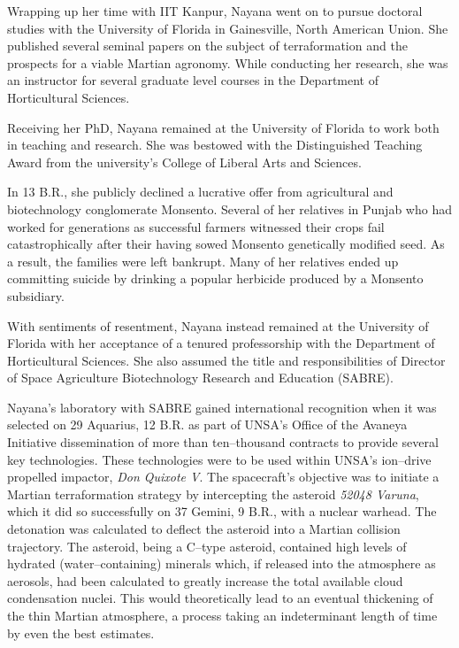 Wrapping up her time with IIT Kanpur, Nayana went on to pursue doctoral studies with the University of Florida in Gainesville, North American Union. She published several seminal papers on the subject of terraformation and the prospects for a viable Martian agronomy. While conducting her research, she was an instructor for several graduate level courses in the Department of Horticultural Sciences.

Receiving her PhD, Nayana remained at the University of Florida to work both in teaching and research. She was bestowed with the Distinguished Teaching Award from the university's College of Liberal Arts and Sciences. 

In 13 B.R., she publicly declined a lucrative offer from agricultural and biotechnology conglomerate Monsento. Several of her relatives in Punjab who had worked for generations as successful farmers witnessed their crops fail catastrophically after their having sowed Monsento genetically modified seed. As a result, the families were left bankrupt. Many of her relatives ended up committing suicide by drinking a popular herbicide produced by a Monsento subsidiary. 

With sentiments of resentment, Nayana instead remained at the University of Florida with her acceptance of a tenured professorship with the Department of Horticultural Sciences. She also assumed the title and responsibilities of Director of Space Agriculture Biotechnology Research and Education (SABRE).

Nayana's laboratory with SABRE gained international recognition when it was selected on 29 Aquarius, 12 B.R. as part of UNSA's Office of the Avaneya Initiative dissemination of more than ten--thousand contracts to provide several key technologies. These technologies were to be used within UNSA's ion--drive propelled impactor, {\it Don Quixote V}. The spacecraft's objective was to initiate a Martian terraformation strategy by intercepting the asteroid {\it 52048 Varuna}, which it did so successfully on 37 Gemini, 9 B.R., with a nuclear warhead. The detonation was calculated to deflect the asteroid into a Martian collision trajectory. The asteroid, being a C--type asteroid, contained high levels of hydrated (water--containing) minerals which, if released into the atmosphere as aerosols, had been calculated to greatly increase the total available cloud condensation nuclei. This would theoretically lead to an eventual thickening of the thin Martian atmosphere, a process taking an indeterminant length of time by even the best estimates.

